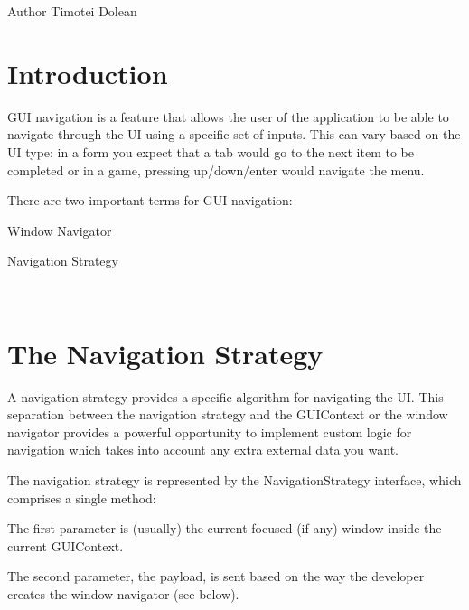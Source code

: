 \begin{DoxyAuthor}{Author}
Timotei Dolean
\end{DoxyAuthor}
\hypertarget{gui_navigation_tutorial_gui_navigation_tutorial_intro}{}\section{Introduction}\label{gui_navigation_tutorial_gui_navigation_tutorial_intro}
G\+UI navigation is a feature that allows the user of the application to be able to navigate through the UI using a specific set of inputs. This can vary based on the UI type\+: in a form you expect that a {\ttfamily tab} would go to the next item to be completed or in a game, pressing up/down/enter would navigate the menu.

There are two important terms for G\+UI navigation\+:
\begin{DoxyItemize}
\item Window Navigator
\item Navigation Strategy
\end{DoxyItemize}

~\newline
 \hypertarget{gui_navigation_tutorial_gui_navigation_tutorial_navigation_strategy}{}\section{The Navigation Strategy}\label{gui_navigation_tutorial_gui_navigation_tutorial_navigation_strategy}
A navigation strategy provides a specific algorithm for navigating the UI. This separation between the navigation strategy and the G\+U\+I\+Context or the window navigator provides a powerful opportunity to implement custom logic for navigation which takes into account any extra external data you want.

The navigation strategy is represented by the Navigation\+Strategy interface, which comprises a single method\+: 
\begin{DoxyCode}{0}
\end{DoxyCode}



\begin{DoxyItemize}
\item The first parameter is (usually) the current focused (if any) window inside the current G\+U\+I\+Context.
\item The second parameter, the payload, is sent based on the way the developer creates the window navigator (see below).
\end{DoxyItemize}


